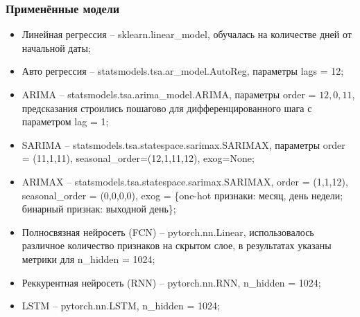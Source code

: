 \documentclass[aspectratio=169,8pt]{beamer}
\begin{document}
\begin{frame}
\frametitle{Применённые модели}
\begin{itemize}
\item Линейная регрессия -- sklearn.linear\_model, обучалась на количестве дней от начальной даты;\\
\item Авто регрессия -- statsmodels.tsa.ar\_model.AutoReg, параметры lags = 12; \\
\item ARIMA -- statsmodels.tsa.arima\_model.ARIMA, параметры order = \(12,0,11\), предсказания строились пошагово для дифференцированного шага с параметром lag = 1; \\
\item SARIMA -- statsmodels.tsa.statespace.sarimax.SARIMAX, параметры order = (11,1,11), seasonal\_order=(12,1,11,12), exog=None;\\
\item ARIMAX -- statsmodels.tsa.statespace.sarimax.SARIMAX, order = (1,1,12), seasonal\_order = (0,0,0,0), exog = \{one-hot признаки: месяц, день недели; бинарный признак: выходной день\};\\
\item Полносвязная нейросеть (FCN) -- pytorch.nn.Linear, использовалось различное количество признаков на скрытом слое, в результатах указаны метрики для n\_hidden = 1024; \\
\item Реккурентная нейросеть  (RNN) -- pytorch.nn.RNN, n\_hidden = 1024; \\
\item LSTM -- pytorch.nn.LSTM, n\_hidden = 1024; \\
\end{itemize}

\end{frame}
\end{document}
